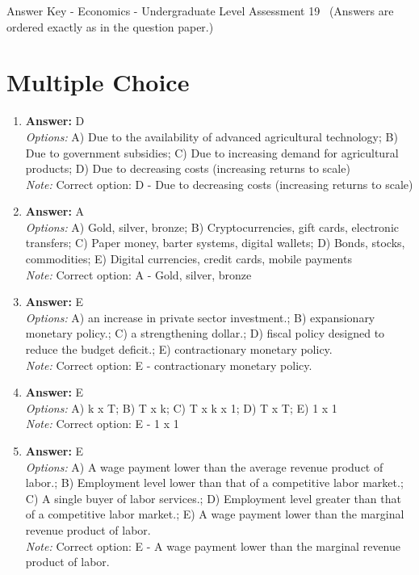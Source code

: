 \documentclass[12pt]{article}
\begin{document}
\begin{center}
Answer Key - Economics - Undergraduate Level Assessment 19 \
\small (Answers are ordered exactly as in the question paper.)
\end{center}

\section*{Multiple Choice}
\begin{enumerate}[label=\arabic*.]
\item \textbf{Answer:} D
\\ \textit{Options:} A) Due to the availability of advanced agricultural technology; B) Due to government subsidies; C) Due to increasing demand for agricultural products; D) Due to decreasing costs (increasing returns to scale)
\\ \textit{Note:} Correct option: D - Due to decreasing costs (increasing returns to scale)
\item \textbf{Answer:} A
\\ \textit{Options:} A) Gold, silver, bronze; B) Cryptocurrencies, gift cards, electronic transfers; C) Paper money, barter systems, digital wallets; D) Bonds, stocks, commodities; E) Digital currencies, credit cards, mobile payments
\\ \textit{Note:} Correct option: A - Gold, silver, bronze
\item \textbf{Answer:} E
\\ \textit{Options:} A) an increase in private sector investment.; B) expansionary monetary policy.; C) a strengthening dollar.; D) fiscal policy designed to reduce the budget deficit.; E) contractionary monetary policy.
\\ \textit{Note:} Correct option: E - contractionary monetary policy.
\item \textbf{Answer:} E
\\ \textit{Options:} A) k x T; B) T x k; C) T x k x 1; D) T x T; E) 1 x 1
\\ \textit{Note:} Correct option: E - 1 x 1
\item \textbf{Answer:} E
\\ \textit{Options:} A) A wage payment lower than the average revenue product of labor.; B) Employment level lower than that of a competitive labor market.; C) A single buyer of labor services.; D) Employment level greater than that of a competitive labor market.; E) A wage payment lower than the marginal revenue product of labor.
\\ \textit{Note:} Correct option: E - A wage payment lower than the marginal revenue product of labor.
\end{enumerate}
\end{document}
